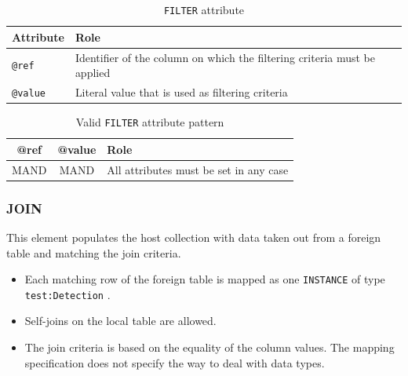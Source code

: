 \documentclass[11pt,a4paper]{ivoa}
\begin{document}
\begin{table}[!htbp]
\small
\centering
\begin{tabulary}{\linewidth}{|L|J|}
       \hline
           \textbf{Attribute} &  
           \textbf{Role} \\
       \hline  \hline
           \texttt{@ref}    & 
           Identifier of the column on which the filtering criteria must be applied \\       
        \hline 
           \texttt{@value}    & 
           Literal value that is used as filtering criteria \\       
        \hline 
\end{tabulary}
\caption{\texttt{FILTER} attribute} 
\label{tbl:filter-att}
\end{table}

\begin{table}[!htbp]
\small
\centering
\begin{tabulary}{\linewidth}{|C|CJ|}
       \hline
           \textbf{@ref} &  
           \textbf{@value} &                     

           \textbf{Role} \\
       \hline   \hline
           MAND    &            

           MAND    & 
           All attributes must be set in any case \\       
       \hline 
\end{tabulary}
\caption{Valid \texttt{FILTER} attribute pattern} 
\label{tbl:filter-patterns}
\end{table}


%
%
\FloatBarrier
\subsubsection{JOIN}
This element populates the host collection with data taken out from a foreign table and matching the join criteria.

\begin{itemize}
    \item Each matching row of the foreign table is mapped as  one \texttt{INSTANCE} of type \texttt{test:Detection} .
    \item Self-joins  on the local table are allowed.
    \item The join criteria is based on the equality of the column values. 
             The mapping specification does not specify the way to deal with data types.
\end{itemize}
\end{document}
